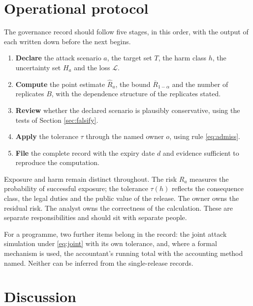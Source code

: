 \documentclass[11pt,a4paper]{article}
\theoremstyle{plain}
\theoremstyle{definition}
\begin{document}
\section{Operational protocol}\label{sec:protocol}

The governance record should follow five stages, in this order, with the output
of each written down before the next begins.

\begin{enumerate}
\item \textbf{Declare} the attack scenario $a$, the target set $T$, the harm
class $h$, the uncertainty set $H_a$ and the loss $\mathcal{L}$.
\item \textbf{Compute} the point estimate $\widehat{R}_a$, the bound
$\overline{R}_{1-\alpha}$ and the number of replicates $B$, with the dependence structure
of the replicates stated.
\item \textbf{Review} whether the declared scenario is plausibly conservative,
using the tests of Section \ref{sec:falsify}.
\item \textbf{Apply} the tolerance $\tau$ through the named owner $o$, using
rule \eqref{eq:admiss}.
\item \textbf{File} the complete record with the expiry date $d$ and evidence
sufficient to reproduce the computation.
\end{enumerate}

Exposure and harm remain distinct throughout. The risk $R_a$ measures the
probability of successful exposure; the tolerance $\tau(h)$ reflects the
consequence class, the legal duties and the public value of the release. The
owner owns the residual risk. The analyst owns the correctness of the
calculation. These are separate responsibilities and should sit with separate
people.

For a programme, two further items belong in the record: the joint attack
simulation under \eqref{eq:joint} with its own tolerance, and, where a formal
mechanism is used, the accountant's running total with the accounting method
named. Neither can be inferred from the single-release records.

\section{Discussion}\label{sec:disc}
\end{document}
